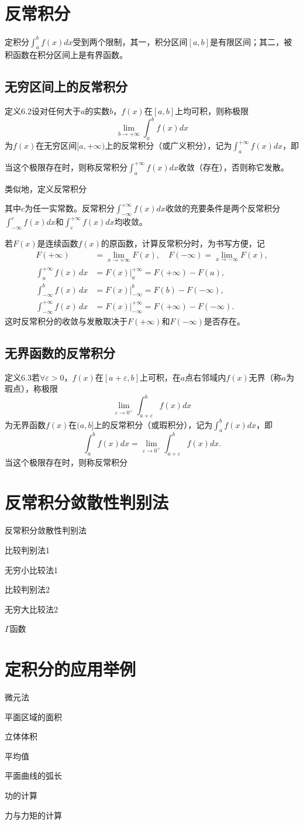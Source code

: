 \section{反常积分}
定积分$\int_a^bf(x)dx$受到两个限制，其一，积分区间$[a,b]$是有限区间；其二，被积函数在积分区间上是有界函数。

\subsection{无穷区间上的反常积分}

定义6.2\quad 设对任何大于$a$的实数$b$，$f(x)$在$[a,b]$上均可积，则称极限
\[
\lim_{b\to+\infty}\int_a^bf(x)dx
\]
为$f(x)$在无穷区间$[a,+\infty)$上的反常积分（或广义积分），记为$\int_a^{+\infty}f(x)dx$，即

当这个极限存在时，则称反常积分$\int_a^{+\infty}f(x)dx$收敛（存在），否则称它发散。

类似地，定义反常积分


其中$c$为任一实常数。反常积分$\int_{-\infty}^{+\infty}f(x)dx$收敛的充要条件是两个反常积分$\int_{-\infty}^{c}f(x)dx$和$\int_{c}^{+\infty}f(x)dx$均收敛。

若$F(x)$是连续函数$f(x)$的原函数，计算反常积分时，为书写方便，记
\[
\begin{aligned}
F(+\infty) &= \lim_{x \to +\infty} F(x), \quad F(-\infty) = \lim_{x \to -\infty} F(x), \\
\int_a^{+\infty} f(x) \, dx &= F(x) \bigg|_a^{+\infty} = F(+\infty) - F(a), \\
\int_{-\infty}^b f(x) \, dx &= F(x) \bigg|_{-\infty}^b = F(b) - F(-\infty), \\
\int_{-\infty}^{+\infty} f(x) \, dx &= F(x) \bigg|_{-\infty}^{+\infty} = F(+\infty) - F(-\infty).
\end{aligned}
\]
这时反常积分的收敛与发散取决于$F(+\infty)$和$F(-\infty)$是否存在。

\subsection{无界函数的反常积分}

定义6.3\quad 若$\forall \varepsilon > 0$，$f(x)$在$[a+\varepsilon,b]$上可积，在$a$点右邻域内$f(x)$无界（称$a$为瑕点），称极限
\[
\lim_{\varepsilon\to0^+}\int_{a+\varepsilon}^bf(x)dx
\]
为无界函数$f(x)$在$(a,b]$上的反常积分（或瑕积分），记为$\int_a^bf(x)dx$，即
\[
\int_a^bf(x)dx=\lim_{\varepsilon\to0^+}\int_{a+\varepsilon}^{b}f(x)dx.
\]
当这个极限存在时，则称反常积分

\section{反常积分敛散性判别法}

反常积分敛散性判别法

比较判别法1

无穷小比较法1

比较判别法2

无穷大比较法2

$\Gamma$函数

\section{定积分的应用举例}

微元法

平面区域的面积

立体体积

平均值

平面曲线的弧长

功的计算

力与力矩的计算